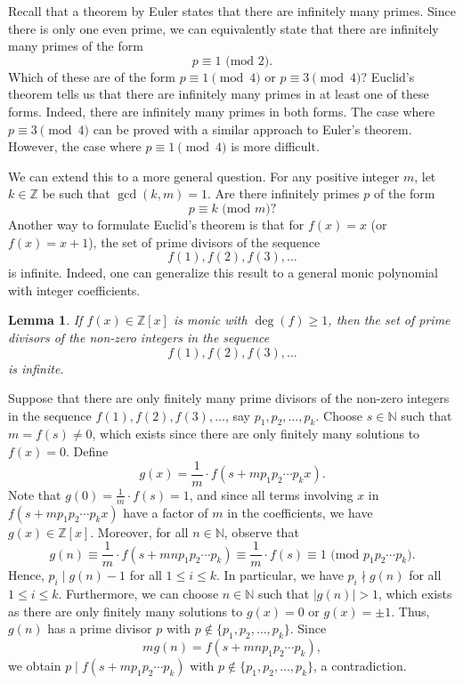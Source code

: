 \documentclass[10pt]{article}
\makeatletter
\newcommand{\N}{\mathbb{N}}
\newcommand{\Z}{\mathbb{Z}}
\theoremstyle{newstyle}
\newtheorem{lemma}[thm]{Lemma}
\newenvironment{pf}[1][\proofname]{\par
  \pushQED{\qed}%
  \normalfont \topsep0\p@\relax
  \trivlist
  \item[\hskip\labelsep\scshape
  #1\@addpunct{.}]\ignorespaces
}{%
  \popQED\endtrivlist\@endpefalse
}
\makeatother
\begin{document}
Recall that a theorem by Euler states that there are infinitely many primes. Since there is only 
one even prime, we can equivalently state that there are infinitely many primes of the form 
\[ p \equiv 1 \text{ (mod 2)}. \] 
Which of these are of the form $p \equiv 1 \pmod 4$ or $p \equiv 3 \pmod 4$? Euclid's theorem 
tells us that there are infinitely many primes in at least one of these forms. Indeed, there 
are infinitely many primes in both forms. The case where $p \equiv 3 \pmod 4$ can be proved with a 
similar approach to Euler's theorem. However, the case where $p \equiv 1 \pmod 4$ is more difficult. 

We can extend this to a more general question. For any positive integer $m$, let $k \in \Z$ 
be such that $\gcd(k, m) = 1$. Are there infinitely primes $p$ of the form 
\[ p \equiv k \text{ (mod $m$)}? \]
Another way to formulate Euclid's theorem is that for $f(x) = x$ (or $f(x) = x+1$), the set of prime 
divisors of the sequence 
\[ f(1), f(2), f(3), \dots \] 
is infinite. Indeed, one can generalize this result to a general monic polynomial with integer coefficients.

\begin{lemma}
If $f(x) \in \Z[x]$ is monic with $\deg(f) \geq 1$, then the set of prime divisors of the 
non-zero integers in the sequence 
\[ f(1), f(2), f(3), \dots \] 
is infinite. 
\end{lemma}
\begin{pf}
Suppose that there are only finitely many prime divisors of the non-zero integers in the sequence 
$f(1), f(2), f(3), \dots$, say $p_1, p_2, \dots, p_k$. Choose $s \in \N$ such that $m = f(s) \neq 0$, 
which exists since there are only finitely many solutions to $f(x) = 0$. Define 
\[ g(x) = \frac1m \cdot f(s + mp_1p_2 \cdots p_kx). \]
Note that $g(0) = \frac1m \cdot f(s) = 1$, and since all terms involving $x$ in 
$f(s+mp_1p_2\cdots p_kx)$ have a factor of $m$ in the coefficients, we have $g(x) \in \Z[x]$. 
Moreover, for all $n \in \N$, observe that 
\[ g(n) \equiv \frac1m \cdot f(s + mnp_1p_2 \cdots p_k) \equiv \frac1m \cdot f(s) \equiv 1 
\text{ (mod $p_1p_2 \cdots p_k$)}. \]
Hence, $p_i \mid g(n) - 1$ for all $1 \leq i \leq k$. In particular, we have $p_i \nmid g(n)$ for all 
$1 \leq i \leq k$. Furthermore, we can choose $n \in \N$ such that $|g(n)| > 1$, which exists as there 
are only finitely many solutions to $g(x) = 0$ or $g(x) = \pm1$. Thus, $g(n)$ has a prime divisor 
$p$ with $p \notin \{p_1, p_2, \dots, p_k\}$. Since 
\[ mg(n) = f(s+mnp_1p_2\cdots p_k), \]
we obtain $p \mid f(s+mp_1p_2 \cdots p_k)$ with $p \notin \{p_1, p_2, \dots, p_k\}$, a contradiction. 
\end{pf}
\end{document}
